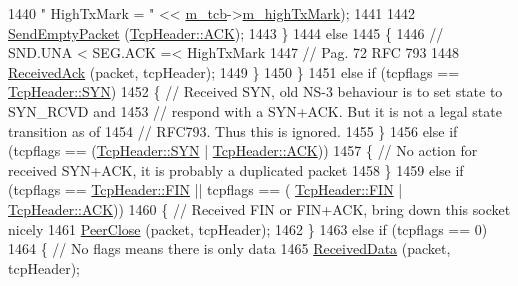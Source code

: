 \begin{DoxyCode}
1440                        \textcolor{stringliteral}{" HighTxMark = "} << \hyperlink{classns3_1_1TcpSocketBase_a26bbaf59001308dc43fb630d76f2e38b}{m\_tcb}->\hyperlink{classns3_1_1TcpSocketState_a2c46f51fd8e2bf43b564ea838b43b8bb}{m\_highTxMark});
1441 
1442           \hyperlink{classns3_1_1TcpSocketBase_aa858913c9a4480a14d293f1014905b3e}{SendEmptyPacket} (\hyperlink{classns3_1_1TcpHeader_a5f3d432941327854b5ad621e467479c6a1182e63050402c9f49208c62c1ec2d5c}{TcpHeader::ACK});
1443         \}
1444       \textcolor{keywordflow}{else}
1445         \{
1446           \textcolor{comment}{// SND.UNA < SEG.ACK =< HighTxMark}
1447           \textcolor{comment}{// Pag. 72 RFC 793}
1448           \hyperlink{classns3_1_1TcpSocketBase_a695c036628adf8a204a653dbf178f8cd}{ReceivedAck} (packet, tcpHeader);
1449         \}
1450     \}
1451   \textcolor{keywordflow}{else} \textcolor{keywordflow}{if} (tcpflags == \hyperlink{classns3_1_1TcpHeader_a5f3d432941327854b5ad621e467479c6aa28ef8087c3cb5f3db10d728063b6ac0}{TcpHeader::SYN})
1452     \{ \textcolor{comment}{// Received SYN, old NS-3 behaviour is to set state to SYN\_RCVD and}
1453       \textcolor{comment}{// respond with a SYN+ACK. But it is not a legal state transition as of}
1454       \textcolor{comment}{// RFC793. Thus this is ignored.}
1455     \}
1456   \textcolor{keywordflow}{else} \textcolor{keywordflow}{if} (tcpflags == (\hyperlink{classns3_1_1TcpHeader_a5f3d432941327854b5ad621e467479c6aa28ef8087c3cb5f3db10d728063b6ac0}{TcpHeader::SYN} | \hyperlink{classns3_1_1TcpHeader_a5f3d432941327854b5ad621e467479c6a1182e63050402c9f49208c62c1ec2d5c}{TcpHeader::ACK}))
1457     \{ \textcolor{comment}{// No action for received SYN+ACK, it is probably a duplicated packet}
1458     \}
1459   \textcolor{keywordflow}{else} \textcolor{keywordflow}{if} (tcpflags == \hyperlink{classns3_1_1TcpHeader_a5f3d432941327854b5ad621e467479c6ad523ac42b96f79a086261246e83b5244}{TcpHeader::FIN} || tcpflags == (
      \hyperlink{classns3_1_1TcpHeader_a5f3d432941327854b5ad621e467479c6ad523ac42b96f79a086261246e83b5244}{TcpHeader::FIN} | \hyperlink{classns3_1_1TcpHeader_a5f3d432941327854b5ad621e467479c6a1182e63050402c9f49208c62c1ec2d5c}{TcpHeader::ACK}))
1460     \{ \textcolor{comment}{// Received FIN or FIN+ACK, bring down this socket nicely}
1461       \hyperlink{classns3_1_1TcpSocketBase_a417d981796bf0919582c843403f823ad}{PeerClose} (packet, tcpHeader);
1462     \}
1463   \textcolor{keywordflow}{else} \textcolor{keywordflow}{if} (tcpflags == 0)
1464     \{ \textcolor{comment}{// No flags means there is only data}
1465       \hyperlink{classns3_1_1TcpSocketBase_a479e1a8be1ee1b169f87e57a4dc6f73c}{ReceivedData} (packet, tcpHeader);

\end{DoxyCode}
